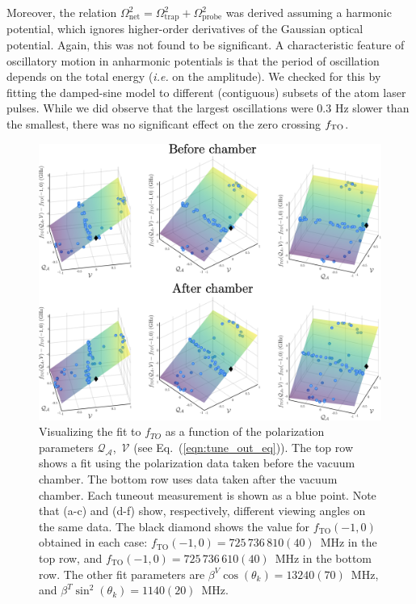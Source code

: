 	Moreover, the relation $\Omega_{\text{net}}^2=\Omega_{\text{trap}}^2+\Omega_{\text{probe}}^2$ was derived assuming a harmonic potential, which ignores higher-order derivatives of the Gaussian optical potential.
	Again, this was not found to be significant.
	A characteristic feature of oscillatory motion in anharmonic potentials is that the period of oscillation depends on the total energy (\emph{i.e.} on the amplitude).
	We checked for this by fitting the damped-sine model to different (contiguous) subsets of the atom laser pulses.
	While we did observe that the largest oscillations were 0.3 Hz slower than the smallest, there was no significant effect on the zero crossing $f_\mathrm{TO}$.  


	\begin{figure}
	    \centering
	    \includegraphics[width=\textwidth]{fig/tuneout/polz_pre_post}
	\caption{Visualizing the fit to $f_{TO}$ as a function of the polarization parameters $\mathcal{Q_{A}}$,\, $\mathcal{V}$  (see Eq.~(\ref{eqn:tune_out_eq})). The top row shows a fit using the polarization data taken before the vacuum chamber. The bottom row uses data taken after the vacuum chamber.  Each tuneout measurement is shown as a blue point. Note that (a-c) and (d-f) show, respectively, different viewing angles on the same data. The black diamond shows the value for \(f_{\mathrm{TO}}(-1,0)\) obtained in each case: \(f_{\mathrm{TO}}(-1,0)=725\, 736\, 810(40)\)~MHz in the top row, and \(f_{\mathrm{TO}}(-1,0)=725\, 736\, 610(40)\)~MHz in the bottom row. The other fit parameters are \(\beta^V \cos(\theta_k)=13240(70)\)~MHz, and \(\beta^T \sin^2(\theta_k)=1140(20)\)~MHz.}
	\label{fig:full_tune_out}
	\end{figure}

